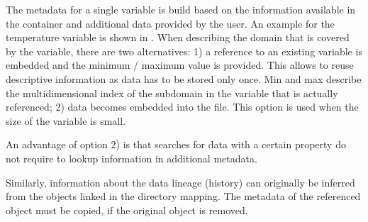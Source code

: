 The metadata for a single variable is build based on the information available in the container and additional data provided by the user.
An example for the temperature variable is shown in .
When describing the domain that is covered by the variable, there are two alternatives:
1) a reference to an existing variable is embedded and the minimum / maximum value is provided.
This allows to reuse descriptive information as data has to be stored only once. Min and max describe the multidimensional index of the subdomain in the variable that is actually referenced;
2) data becomes embedded into the file. This option is used when the size of the variable is small.

An advantage of option 2) is that searches for data with a certain property do not require to lookup information in additional metadata.

Similarly, information about the data lineage (history) can originally be inferred from the objects linked in the directory mapping.
The metadata of the referenced object must be copied, if the original object is removed.


